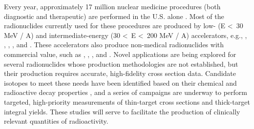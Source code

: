 \documentclass[3p]{elsarticle}
\newcommand{\comment}[1]{\todo[color=blue!20!white,inline]{ASV: #1}}
\begin{document}
Every year, approximately 17 million nuclear medicine procedures (both diagnostic and therapeutic) are performed in the U.S. alone 
\cite{Delbeke2011,NSACIsotopesSubcommittee2015}.
Most of the radionuclides currently used for these procedures are produced 
by low- (E \textless\ 30 MeV / A) and intermediate-energy (30 \textless\ E \textless\ 200 MeV / A) accelerators, 
e.g., , , , , and . 
These accelerators also produce 
non-medical radionuclides with commercial value, such as  , , , and   \cite{international2009iaea,schlyer2008cyclotron}. 
Novel applications are being explored for several radionuclides whose production methodologies are not established, but their production requires accurate, high-fidelity cross section data.
Candidate isotopes to meet these needs 
have been identified based on their chemical and radioactive decay properties \cite{NSACIsotopesSubcommittee2015,Qaim201731,bernstein2015nuclear}, and a series of campaigns are underway to perform targeted, high-priority measurements of thin-target cross sections and thick-target integral yields.
These studies will serve to facilitate the production of clinically relevant quantities of radioactivity.
\end{document}
